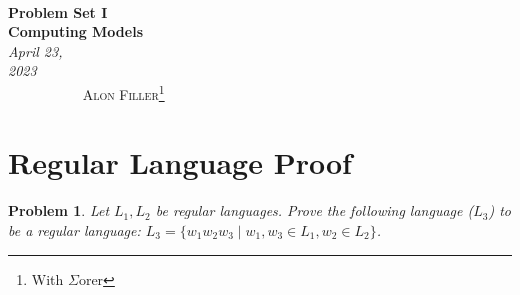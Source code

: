 \documentclass[12pt]{article}
\renewcommand{\=}[1]{\stackrel{#1}{=}} %
\newtheorem{p}{Problem}[section]
\theoremstyle{definition}
\begin{document}
{\noindent\Huge\bf  \\[0.5\baselineskip] {\selectfont  Problem Set I}         }\\[2\baselineskip] %
{ {\bf {}\selectfont Computing Models}\\ {\textit{\selectfont     April 23, 2023}}}~~~~~~~~~~~~~~~~~~~~~~~~~~~~~~~~~~~~~~~~~~~~~~~~~~~~~~~~~~~~~~~~~~~~~~~~~~~~~    {\large \textsc{Alon Filler}\footnote{With $\Sigma$orer}} %
\\[1.4\baselineskip] 

\section{Regular Language Proof}
\begin{p}
\emph{\newline Let $L_1, L_2$ be regular languages. \newline Prove the following language ($L_3$) to be a regular language: \newline $L_3 = \{w_1w_2w_3 \mid w_1, w_3 \in L_1, w_2 \in L_2\}$.}
\end{p}
\end{document}
